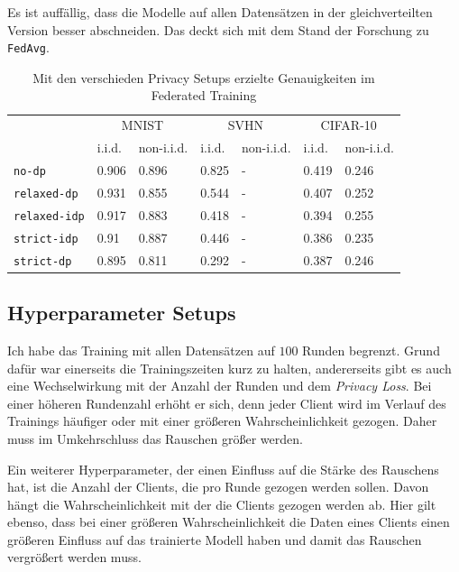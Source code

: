 Es ist auffällig, dass die Modelle auf allen Datensätzen in der gleichverteilten Version besser abschneiden. Das deckt sich mit dem Stand der Forschung zu \texttt{FedAvg}.

\begin{table}
	\centering
	\begin{tabular}{lp{4em}p{4em}p{4em}p{4em}p{4em}p{4em}}
		\toprule 
	 	& \multicolumn{2}{c}{MNIST} & \multicolumn{2}{c}{SVHN} & \multicolumn{2}{c}{CIFAR-10} \\
		\cmidrule(lr){2-3}\cmidrule(lr){4-5}\cmidrule(lr){6-7}
		& i.i.d. & non-i.i.d. & i.i.d. & non-i.i.d. & i.i.d. & non-i.i.d. \\
		\midrule
		\texttt{no-dp} & 0.906 & 0.896 & 0.825 & - & 0.419 & 0.246 \\
		\texttt{relaxed-dp} & 0.931 & 0.855 & 0.544 & - & 0.407 & 0.252 \\
		\texttt{relaxed-idp} & 0.917 & 0.883 & 0.418 & - & 0.394 & 0.255 \\
		\texttt{strict-idp} & 0.91 & 0.887 & 0.446 & - & 0.386 & 0.235 \\
		\texttt{strict-dp} & 0.895 & 0.811 & 0.292 & - & 0.387 & 0.246 \\
		\bottomrule
	\end{tabular}
	\caption{Mit den verschieden Privacy Setups erzielte Genauigkeiten im Federated Training}
	\label{tab:all-fed-results}
\end{table}

\subsection{Hyperparameter Setups}
Ich habe das Training mit allen Datensätzen auf $100$ Runden begrenzt. Grund dafür war einerseits die Trainingszeiten kurz zu halten, andererseits gibt es auch eine Wechselwirkung mit der Anzahl der Runden und dem \textit{Privacy Loss}. Bei einer höheren Rundenzahl erhöht er sich, denn jeder Client wird im Verlauf des Trainings häufiger oder mit einer größeren Wahrscheinlichkeit gezogen. Daher muss im Umkehrschluss das Rauschen größer werden. 

Ein weiterer Hyperparameter, der einen Einfluss auf die Stärke des Rauschens hat, ist die Anzahl der Clients, die pro Runde gezogen werden sollen. Davon hängt die Wahrscheinlichkeit mit der die Clients gezogen werden ab. Hier gilt ebenso, dass bei einer größeren Wahrscheinlichkeit die Daten eines Clients einen größeren Einfluss auf das trainierte Modell haben und damit das Rauschen vergrößert werden muss.


